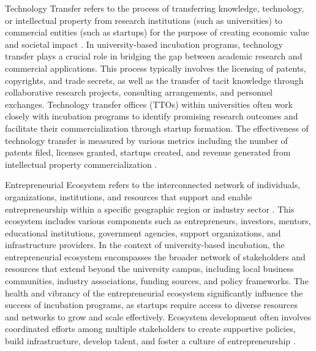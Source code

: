 \documentclass[../Main.tex]{subfiles}
\begin{document}
Technology Transfer refers to the process of transferring knowledge, technology, or intellectual property from research institutions (such as universities) to commercial entities (such as startups) for the purpose of creating economic value and societal impact \autocite{bozeman2000technology, siegel2003assessing}. In university-based incubation programs, technology transfer plays a crucial role in bridging the gap between academic research and commercial applications. This process typically involves the licensing of patents, copyrights, and trade secrets, as well as the transfer of tacit knowledge through collaborative research projects, consulting arrangements, and personnel exchanges. Technology transfer offices (TTOs) within universities often work closely with incubation programs to identify promising research outcomes and facilitate their commercialization through startup formation. The effectiveness of technology transfer is measured by various metrics including the number of patents filed, licenses granted, startups created, and revenue generated from intellectual property commercialization \autocite{phan2005university}.

Entrepreneurial Ecosystem refers to the interconnected network of individuals, organizations, institutions, and resources that support and enable entrepreneurship within a specific geographic region or industry sector \autocite{spigel2017relational, stam2015entrepreneurial}. This ecosystem includes various components such as entrepreneurs, investors, mentors, educational institutions, government agencies, support organizations, and infrastructure providers. In the context of university-based incubation, the entrepreneurial ecosystem encompasses the broader network of stakeholders and resources that extend beyond the university campus, including local business communities, industry associations, funding sources, and policy frameworks. The health and vibrancy of the entrepreneurial ecosystem significantly influence the success of incubation programs, as startups require access to diverse resources and networks to grow and scale effectively. Ecosystem development often involves coordinated efforts among multiple stakeholders to create supportive policies, build infrastructure, develop talent, and foster a culture of entrepreneurship \autocite{isenberg2011introducing}.
\end{document}
